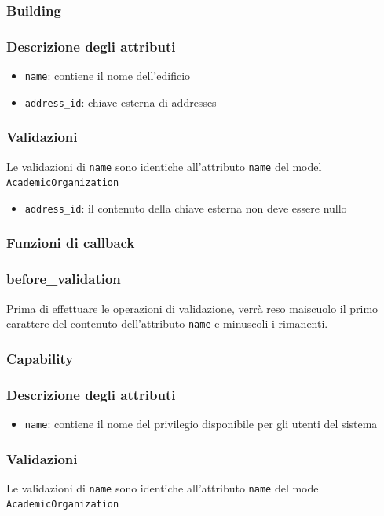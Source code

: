 \documentclass[11pt,a4paper]{article}
\begin{document}
\subsubsection{Building}
\subsubsection*{Descrizione degli attributi}
\begin{itemize}
 \item \verb|name|: contiene il nome dell'edificio
 \item \verb|address_id|: chiave esterna di addresses	
\end{itemize}
\subsubsection*{Validazioni}
Le validazioni di \verb|name| sono identiche all'attributo \verb|name| del model \\ \verb|AcademicOrganization|
\begin{itemize}
 \item \verb|address_id|: il contenuto della chiave esterna non deve essere nullo
\end{itemize}
\subsubsection*{Funzioni di callback}
\subsubsection*{before\_validation}
Prima di effettuare le operazioni di validazione, verrà reso maiscuolo il primo carattere del contenuto dell'attributo \verb|name| e minuscoli i rimanenti.
\subsubsection{Capability}
\subsubsection*{Descrizione degli attributi}
\begin{itemize}
 \item \verb|name|: contiene il nome del privilegio disponibile per gli utenti del sistema
\end{itemize}
\subsubsection*{Validazioni}
Le validazioni di \verb|name| sono identiche all'attributo \verb|name| del model \\ \verb|AcademicOrganization|
\end{document}
